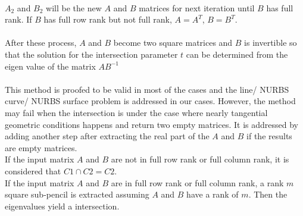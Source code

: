 \paragraph{}
$A_2$ and $B_2$ will be the new $A$ and $B$ matrices for next iteration until $B$ has full rank. If $B$ has full row rank but not full rank, $A=A^T$, $B=B^T$.
\paragraph{}
After these process, $A$ and $B$ become two square matrices and $B$ is invertible so that the solution for the intersection parameter $t$ can be determined from the eigen value of the matrix $AB^{-1}$
\paragraph{}
This method is proofed to be valid in most of the cases and the line/ NURBS curve/ NURBS surface problem is addressed in our cases. However, the method may fail when the intersection is under the case where nearly tangential geometric conditions happens and return two empty matrices. It is addressed by adding another step after extracting the real part of the $A$ and $B$ if the results are empty matrices\cite{Shen2016}.\\
If the input matrix $A$ and $B$ are not in full row rank or full column rank, it is considered that $C1 \cap C2 = C2$.\\
If the input matrix $A$ and $B$ are in full row rank or full column rank, a rank $m$ square sub-pencil is extracted assuming $A$ and $B$ have a rank of $m$. Then the eigenvalues yield a intersection.
\pagebreak